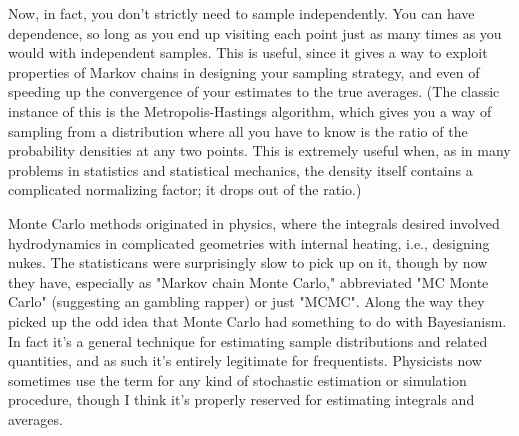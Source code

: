 \documentclass[a4paper,10pt]{article}
\begin{document}
Now, in fact, you don't strictly need to sample independently. You can have dependence, so long as you end up 
visiting each point just as many times as you would with independent samples. This is useful, since it gives a 
way to exploit properties of Markov chains in designing your sampling strategy, and even of speeding up the 
convergence of your estimates to the true averages. (The classic instance of this is the Metropolis-Hastings 
algorithm, which gives you a way of sampling from a distribution where all you have to know is the ratio of 
the probability densities at any two points. This is extremely useful when, as in many problems in statistics 
and statistical mechanics, the density itself contains a complicated normalizing factor; it drops out of the ratio.)

Monte Carlo methods originated in physics, where the integrals desired involved hydrodynamics in complicated 
geometries with internal heating, i.e., designing nukes. The statisticans were surprisingly slow to pick up on it, 
though by now they have, especially as "Markov chain Monte Carlo," abbreviated "MC Monte Carlo" 
(suggesting an gambling rapper) or just "MCMC". Along the way they picked up the odd idea that Monte Carlo had 
something to do with Bayesianism. In fact it's a general technique for estimating sample distributions and 
related quantities, and as such it's entirely legitimate for frequentists. 
Physicists now sometimes use the term for any kind of stochastic estimation or simulation procedure, 
though I think it's properly reserved for estimating integrals and averages. 
\end{document}
